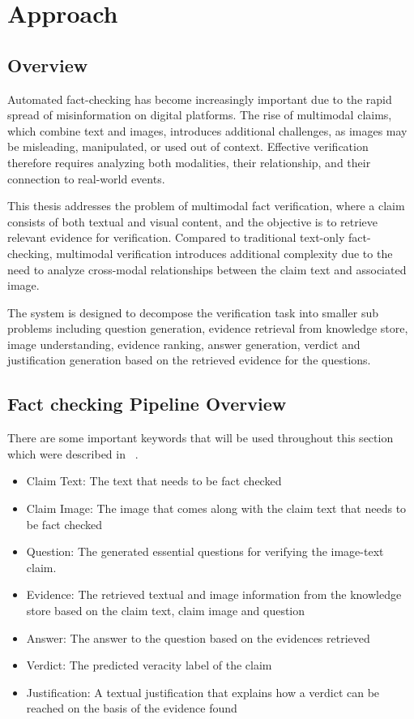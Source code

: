 \chapter{Approach}
\label{ch:approach}

\section{Overview}

\noindent
    Automated fact-checking has become increasingly important due to the rapid spread of misinformation on digital platforms. The rise of multimodal claims, which combine text and images, introduces additional challenges, as images may be misleading, manipulated, or used out of context. Effective verification therefore requires analyzing both modalities, their relationship, and their connection to real-world events.
    
    This thesis addresses the problem of multimodal fact verification, where a claim consists of both textual and visual content, and the objective is to retrieve relevant evidence for verification. Compared to traditional text-only fact-checking, multimodal verification introduces additional complexity due to the need to analyze cross-modal relationships between the claim text and associated image.


The system is designed to decompose the verification task into smaller sub problems including question generation, evidence retrieval from knowledge store, image understanding, evidence ranking, answer generation, verdict and justification generation based on the retrieved evidence for the questions.

\section{Fact checking Pipeline Overview}

There are some important keywords that will be used throughout this section which were described in ~\citet{Cao2025May}.
\begin{itemize}
\item Claim Text: The text that needs to be fact checked
\item Claim Image: The image that comes along with the claim text that needs to be fact checked
    \item Question: The generated essential questions for verifying the image-text claim.
    \item Evidence: The retrieved textual and image information from the knowledge store based on the claim text, claim image and question
    \item Answer: The answer to the question based on the evidences retrieved
    \item Verdict: The predicted veracity label of the claim
    \item Justification: A textual justification that explains how a verdict can be reached on the basis of the evidence found
\end{itemize}




